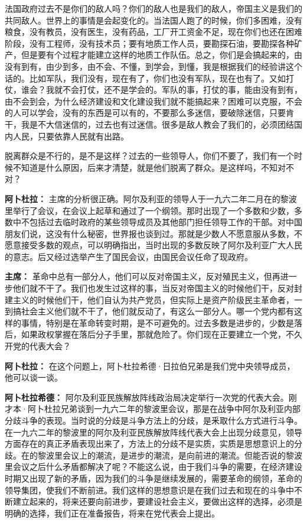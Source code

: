 \begin{duihua}
法国政府过去不是你们的敌人吗？你们的敌人也是我们的敌人，帝国主义是我们的共同敌人。世界上的事情是会起变化的。当法国人跑了的时候，你们多困难，没有粮食，没有教员，没有医生，没有药品，工厂开工资金不足，现在你们也还在困难阶段，没有工程师，没有技术员；要有地质工作人员，要勘探石油，要勘探各种矿产，但是要有个过程才能建立这样的地质工作队伍。总之，你们是会搞起来的，由没有到有，由少到多，由不会、不懂，到学会，到懂，我是根据我们的经验讲这个话的。比如军队，我们没有，现在有了，你们也没有军队，现在也有了。又如打仗，谁会？我就不会打仗，还不是学会的。军队的事，打仗的事，能由没有到有，由不会到会，为什么经济建设和文化建设我们就不能搞起来？困难可以克服，不会的人可以学会，没有的东西是可以有的，不要那么多迷信，要破除迷信，只要肯干，我是不大信迷信的，过去也有过迷信。很多是敌人教会了我们的，必须团结国内人民，只要依靠人民就有出路。

脱离群众是不行的，是不是这样？过去的一些领导人，你们不要了，我们有一个时候不知道是什么原因，后来才清楚，就是他们脱离了群众。是这样吗，不知对不对？

\item[\textbf{阿卜杜拉：}] 主席的分析很正确。阿尔及利亚的领导人于一九六二年二月在的黎波里举行了会议，在会议上起草和通过了一个纲领。那时出现了一个多数和少数，多数中不包括过去临时政府的某些领导成员及其他部门担任领导工作的干部。对中国朋友们说，这没有什么秘密，世界报也谈到过。那就是少数人不愿意服从多数，不愿意接受多数的观点，可以明确指出，当时出现的多数反映了阿尔及利亚广大人民的意志。后又经过选举产生了国民会议，由国民会议任命了现政府。

\item[\textbf{主席：}] 革命中总有一部分人，他们可以反对帝国主义，反对殖民主义，但再进一步他们就不干了。我们也发生过这样的事，当反对帝国主义的时候他们干，反对封建主义的时候他们干，他们自认为共产党员，但实际上是资产阶级民主革命者，一到搞社会主义他们就不干了，他们就反动了，有这么一部分人。哪一个党内都有这样的事情，特别是在革命转变时期，是不可避免的。过去多数是进步的，少数是落后，如果政权掌握在落后分子手里，那就危险了。你们现在正要建立一个党，不久开党的代表大会？

\item[\textbf{阿卜杜拉：}] 在这个问题上，阿卜杜拉希德·日拉伯兄弟是我们党中央领导成员，他可以谈一谈。

\item[\textbf{阿卜杜拉希德：}] 阿尔及利亚民族解放阵线政治局决定举行一次党的代表大会。刚才本·阿卜杜拉兄弟谈到一九六二年的黎波里会议，那是在战争中阿尔及利亚内部分歧斗争的表现。当时说的分歧是斗争方法上的分歧，是釆取什么方式进行斗争。在一九六二年的黎波里的阿尔及利亚民族解放阵线代表大会上出现分歧意见，领导方面存在的真正矛盾表现出来了，方法上的分歧不是实质，实质是思想意识上的分歧。在的黎波里会议上的潮流，是进步的潮流，是向前进的潮流。但能否说的黎波里会议之后什么矛盾都解决了呢？不能这么说，由于我们斗争的需要，在经济建设时期又出现了新的矛盾，因为我们的斗争是继续发展的，需要革命的纲领，革命的领导集团，使我们不断前进。我们这样的思想意识是在我们过去和现在的斗争中不断建立起来的，将来还要向前进步，要建设社会主义，要做出这样的选择，必须是明确的选择，我们正在准备报告，将来在党代表会上提出。


\end{duihua}
